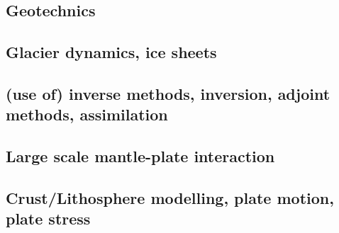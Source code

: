 \subsection*{Geotechnics}

\cite{ster99}
\cite{gora03}
\cite{zhll03}
\cite{gour04}
\cite{gork06}
\cite{bufy14}

\subsection*{Glacier dynamics, ice sheets}

\noindent
\cite{grev97}
\cite{asbl06}
\cite{zhjg11}
\cite{lejx14}
\cite{issg15}\cite{frlg15}
\cite{krab16}

\subsection*{(use of) inverse methods, inversion, adjoint methods, assimilation}

\noindent
\cite{cava98}
\cite{buht03}
\cite{isst04}
\cite{isks07}
\cite{wama09}
\cite{wosp14}\cite{hobo14}
\cite{wahg15}
\cite{ghbu16}\cite{bocf16}
\cite{ligs17}
\cite{bofc18}

\subsection*{Large scale mantle-plate interaction}

\cite{yufl85}
\cite{wamg10}\cite{golw00}
\cite{algs12}\cite{roct12}\cite{crtm12}
\cite{ghbh13}

\subsection*{Crust/Lithosphere modelling, plate motion, plate stress}

